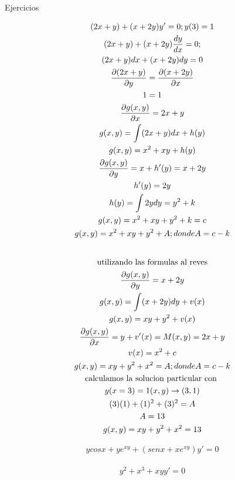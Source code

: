\documentclass{article}
\begin{document}
Ejercicios


\begin{gather*}
(2x+y)+(x+2y)y'=0; y(3)=1 \\
(2x+y)+(x+2y)\frac{dy}{dx}=0; \\
(2x+y)dx+(x+2y)dy=0 \\
\frac{\partial (2x+y)}{\partial y} = \frac{\partial (x+2y)}{\partial x} \\
1 =1  \\
\frac{\partial g(x,y)}{\partial x} =2x+y \\
g(x,y)= \int (2x+y)dx + h(y) \\
g(x,y)= x^{2}+xy+h(y) \\
\frac{\partial g(x,y)}{\partial y} = x+h'(y) = x+2y \\
h'(y) = 2y \\
h(y) = \int 2ydy = y^{2}+k \\
g(x,y)= x^{2}+xy+y^{2}+k = c \\
g(x,y)= x^{2}+xy+y^{2}+A ; donde A = c-k \\
\vspace{0.5em} \\
\text{utilizando las formulas al reves} \\
\frac{\partial g(x,y)}{\partial y} = x+2y \\
g(x,y) = \int (x+2y)dy + v(x) \\
g(x,y) = xy+y^{2}+ v(x) \\
\frac{\partial g(x,y)}{\partial x} =y+ v'(x) = M(x,y)=2x+y \\
v(x) = x^{2}+c \\
g(x,y) = xy+y^{2}+ x^{2} =A; donde A = c-k \\
\text{calculamos la solucion particular con } \\
y(x=3)=1   (x,y)  \rightarrow  (3,1) \\
(3)(1)+(1)^{2}+ (3)^{2} =A \\
A = 13 \\
g(x,y) = xy+y^{2}+ x^{2} =13
\end{gather*}







\begin{gather*}
ycosx+ye^{xy}+(senx+xe^{xy})y' = 0
\end{gather*}





\begin{gather*}
y^{2}+x^{3}+xyy'=0
\end{gather*}
\end{document}
